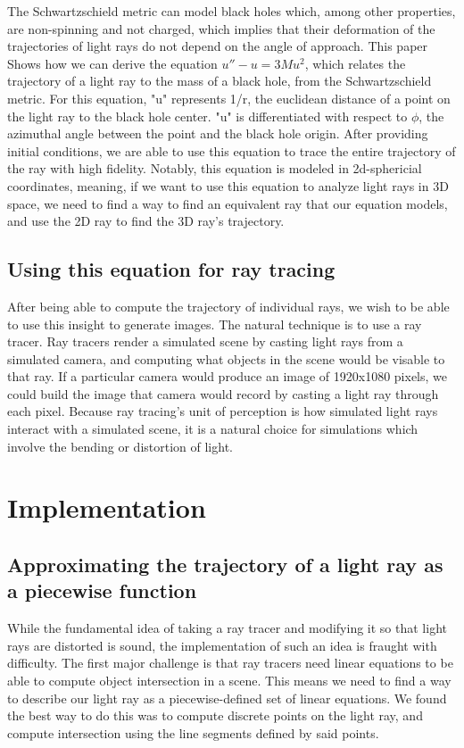 The Schwartzschield metric can model black holes which, among other properties, are non-spinning and not charged, which implies that their deformation of the trajectories of light rays do not depend on the angle of approach. This paper \cite {federov2019notes}  Shows how we can derive the equation $ u'' - u = 3Mu^2 $, which relates the trajectory of a light ray to the mass of a black hole, from the Schwartzschield metric. For this equation, "u" represents 1/r, the euclidean distance of a point on the light ray to the black hole center. "u" is differentiated with respect to $ \phi $, the azimuthal angle between the point and the black hole origin. After providing initial conditions, we are able to use this equation to trace the entire trajectory of the ray with high fidelity. Notably, this equation is modeled in 2d-sphericial coordinates, meaning, if we want to use this equation to analyze light rays in 3D space, we need to find a way to find an equivalent ray that our equation models, and use the 2D ray to find the 3D ray's trajectory.

\subsection {Using this equation for ray tracing}

After being able to compute the trajectory of individual rays, we wish to be able to use this insight to generate images. The natural technique is to use a ray tracer. Ray tracers render a simulated scene by casting light rays from a simulated camera, and computing what objects in the scene would be visable to that ray. If a particular camera would produce an image of 1920x1080 pixels, we could build the image that camera would record by casting a light ray through each pixel. Because ray tracing's unit of perception is how simulated light rays interact with a simulated scene, it is a natural choice for simulations which involve the bending or distortion of light.



\section{Implementation}
\label{sec:impl}


\subsection {Approximating the trajectory of a light ray as a piecewise function}
While the fundamental idea of taking a ray tracer and modifying it so that light rays are distorted is sound, the implementation of such an idea is fraught with difficulty. The first major challenge is that ray tracers need linear equations to be able to compute object intersection in a scene. This means we need to find a way to describe our light ray as a piecewise-defined set of linear equations. We found the best way to do this was to compute discrete points on the light ray, and compute intersection using the line segments defined by said points. 

